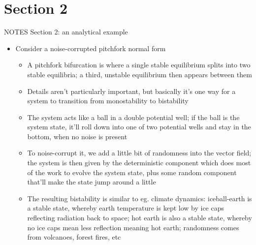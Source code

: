 \documentclass[presentation]{beamer}
\begin{document}
\section{Section 2}
\label{sec:orgc477e3e}
\begin{frame}[label={sec:orgf723e31},plain]{NOTES Section 2: an analytical example}
\begin{itemize}
\item Consider a noise-corrupted pitchfork normal form
\begin{itemize}
\item A pitchfork bifurcation is where a single stable equilibrium splits into two stable equilibria; a third, unstable equilibrium then appears between them
\item Details aren't particularly important, but basically it's one way for a system to transition from monostability to bistability
\item The system acts like a ball in a double potential well; if the ball is the system state, it'll roll down into one of two potential wells and stay in the bottom, when no noise is present
\item To noise-corrupt it, we add a little bit of randomness into the vector field; the system is then given by the deterministic component which does most of the work to evolve the system state, plus some random component that'll make the state jump around a little
\item The resulting bistability is similar to eg. climate dynamics: iceball-earth is a stable state, whereby earth temperature is kept low by ice caps reflecting radiation back to space; hot earth is also a stable state, whereby no ice caps mean less reflection meaning hot earth; randomness comes from volcanoes, forest fires, etc
\end{itemize}
\end{itemize}
\end{frame}
\end{document}
